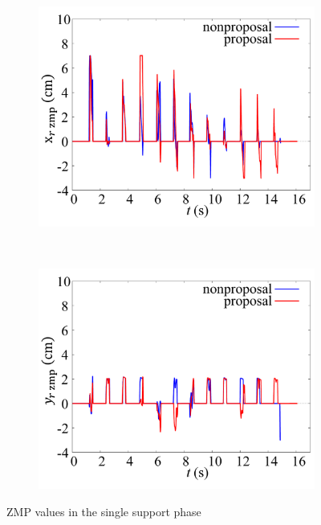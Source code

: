 \documentclass[autodetect-engine,dvipdfmx-if-dvi,ja=standard,a4j,jbase=11pt,magstyle=nomag*]{bxjsreport}
\begin{document}
\begin{figure}[t]
\begin{minipage}{0.49\linewidth}
\begin{subfigure}[c]{\linewidth}
            \label{fig:zmp_ly}%
        \end{subfigure}%
    \end{minipage}%
    \begin{minipage}{0.49\linewidth}%
        \centering
        \begin{subfigure}[c]{\linewidth}
            \centering%
            \includegraphics[width=\linewidth, clip]{./figure/fig11c.pdf}%
            \label{fig:zmp_rx}%
        \end{subfigure}\\ %
        \begin{subfigure}[c]{\linewidth}
            \centering%
            \includegraphics[width=\linewidth, clip]{./figure/fig11d.pdf}%
            \label{fig:zmp_ry}%
        \end{subfigure}%
    \end{minipage}%
    \caption{ZMP values in the single support phase}%
    \label{fig:zmp}%
\end{figure}
\end{document}

